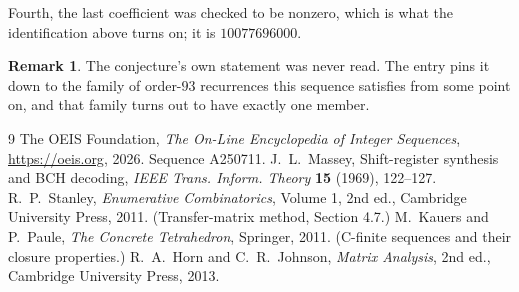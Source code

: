 \documentclass[11pt,a4paper]{article}
\theoremstyle{plain}
\theoremstyle{definition}
\newtheorem{remark}[theorem]{Remark}
\begin{document}
Fourth, the last coefficient was checked to be nonzero, which is what the identification above
turns on; it is $10077696000$.

\begin{remark}
The conjecture's own statement was never read. The entry pins it down to the family of
order-$93$ recurrences this sequence satisfies from some point on, and that family turns
out to have exactly one member.
\end{remark}

\begin{thebibliography}{9}
 The OEIS Foundation, \emph{The On-Line Encyclopedia of Integer
Sequences}, \url{https://oeis.org}, 2026. Sequence A250711.
 J.~L.~Massey, Shift-register synthesis and BCH decoding, \emph{IEEE
Trans. Inform. Theory} \textbf{15} (1969), 122--127.
 R.~P.~Stanley, \emph{Enumerative Combinatorics}, Volume 1, 2nd ed.,
Cambridge University Press, 2011. (Transfer-matrix method, Section 4.7.)
 M.~Kauers and P.~Paule, \emph{The Concrete Tetrahedron}, Springer, 2011.
(C-finite sequences and their closure properties.)
 R.~A.~Horn and C.~R.~Johnson, \emph{Matrix Analysis}, 2nd ed., Cambridge
University Press, 2013.
\end{thebibliography}
\end{document}
